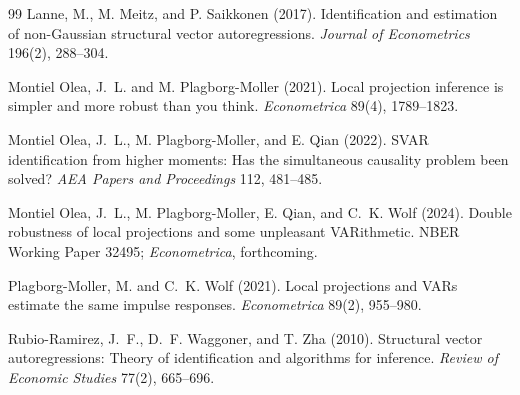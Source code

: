 \documentclass[11pt]{article}
\theoremstyle{definition}
\theoremstyle{plain}
\theoremstyle{remark}
\begin{document}
\begin{thebibliography}{99}
Lanne, M., M. Meitz, and P. Saikkonen (2017).
Identification and estimation of non-Gaussian structural vector autoregressions.
\emph{Journal of Econometrics} 196(2), 288--304.

Montiel Olea, J.~L. and M. Plagborg-Moller (2021).
Local projection inference is simpler and more robust than you think.
\emph{Econometrica} 89(4), 1789--1823.

Montiel Olea, J.~L., M. Plagborg-Moller, and E. Qian (2022).
SVAR identification from higher moments: Has the simultaneous causality problem been solved?
\emph{AEA Papers and Proceedings} 112, 481--485.

Montiel Olea, J.~L., M. Plagborg-Moller, E. Qian, and C.~K. Wolf (2024).
Double robustness of local projections and some unpleasant VARithmetic.
NBER Working Paper 32495; \emph{Econometrica}, forthcoming.

Plagborg-Moller, M. and C.~K. Wolf (2021).
Local projections and VARs estimate the same impulse responses.
\emph{Econometrica} 89(2), 955--980.

Rubio-Ramirez, J.~F., D.~F. Waggoner, and T. Zha (2010).
Structural vector autoregressions: Theory of identification and algorithms for inference.
\emph{Review of Economic Studies} 77(2), 665--696.
\end{thebibliography}
\end{document}
